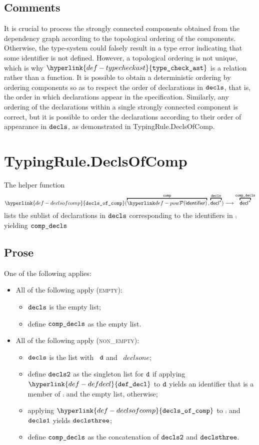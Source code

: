 \documentclass{book}
\newcommand\defdecl[0]{\hyperlink{def-defdecl}{\texttt{def\_decl}}}
\newcommand\typecheckast[0]{\hyperlink{def-typecheckast}{\texttt{type\_check\_ast}}}
\newcommand\declsofcomp[0]{\hyperlink{def-declsofcomp}{\texttt{decls\_of\_comp}}}
\begin{document}
\subsection{Comments}
It is crucial to process the strongly connected components obtained from the dependency graph
according to the topological ordering of the components. Otherwise, the type-system could
falsely result in a type error indicating that some identifier is not defined.
However, a topological ordering is not unique, which is why $\typecheckast$ is a relation rather than
a function.
It is possible to obtain a deterministic ordering by ordering components so as to respect
the order of declarations in $\texttt{decls}$, that is,
the order in which declarations appear in the specification.
Similarly, any ordering of the declarations within a single strongly connected component is correct,
but it is possible to order the declarations according to their order of appearance in $\texttt{decls}$,
as demonstrated in TypingRule.DeclsOfComp.


\section{TypingRule.DeclsOfComp \label{sec:TypingRule.DeclsOfComp}}
\hypertarget{def-declsofcomp}{}
The helper function
\[
\declsofcomp(
  \overname{\pow{\identifier}}{\comp} \aslsep
  \overname{\decl^*}{\decls}
) \aslto \overname{\decl^*}{\compdecls}
\]
lists the sublist of declarations in $\texttt{decls}$ corresponding to the identifiers in $\comp$
yielding $\texttt{comp\_decls}$

\subsection{Prose}
One of the following applies:
\begin{itemize}
  \item All of the following apply (\textsc{empty}):
  \begin{itemize}
    \item $\texttt{decls}$ is the empty list;
    \item define $\texttt{comp\_decls}$ as the empty list.
  \end{itemize}

  \item All of the following apply (\textsc{non\_empty}):
  \begin{itemize}
    \item $\texttt{decls}$ is the list with \head\ $\texttt{d}$ and \tail\ $declsone$;
    \item define $\texttt{decls2}$ as the singleton list for $\texttt{d}$ if applying $\defdecl$ to $\texttt{d}$ yields an identifier
          that is a member of $\comp$ and the empty list, otherwise;
    \item applying $\declsofcomp$ to $\comp$ and $\texttt{decls1}$ yields $\texttt{declsthree}$;
    \item define $\texttt{comp\_decls}$ as the concatenation of $\texttt{decls2}$ and $\texttt{declsthree}$.
  \end{itemize}
\end{itemize}
\end{document}
